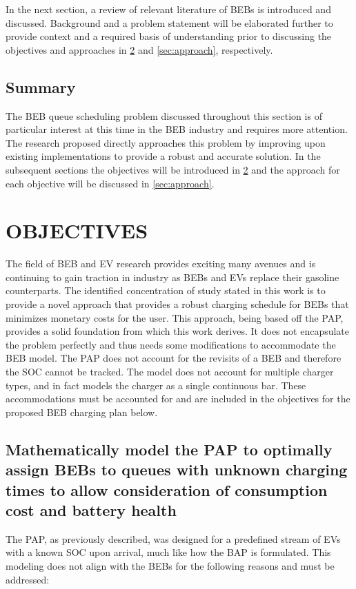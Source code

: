 \documentclass[ee,msthesis]{usuthesis}
\begin{document}
In the next section, a review of relevant literature of BEBs is introduced and discussed. Background and a problem
statement will be elaborated further to provide context and a required basis of understanding prior to discussing the
objectives and approaches in \ref{sec:objectives} and \ref{sec:approach}, respectively.

\section{Summary}
\label{sec:intro-summary}
The BEB queue scheduling problem discussed throughout this section is of particular interest at this time in the BEB
industry and requires more attention. The research proposed directly approaches this problem by improving upon existing
implementations to provide a robust and accurate solution. In the subsequent sections the objectives will be introduced
in \ref{sec:objectives} and the approach for each objective will be discussed in \ref{sec:approach}.
\chapter{OBJECTIVES}
\label{sec:objectives}
The field of BEB and EV research provides exciting many avenues and is continuing to gain traction in industry as BEBs
and EVs replace their gasoline counterparts. The identified concentration of study stated in this work is to provide a
novel approach that provides a robust charging schedule for BEBs that minimizes monetary costs for the user. This
approach, being based off the PAP, provides a solid foundation from which this work derives. It does not encapsulate the
problem perfectly and thus needs some modifications to accommodate the BEB model. The PAP does not account for the
revisits of a BEB and therefore the SOC cannot be tracked. The model does not account for multiple charger types, and in
fact models the charger as a single continuous bar. These accommodations must be accounted for and are included in the
objectives for the proposed BEB charging plan below.

\section{Mathematically model the PAP to optimally assign BEBs to queues with unknown charging times to allow consideration of consumption cost and battery health}
\label{sec:org536fc5f}
The PAP, as previously described, was designed for a predefined stream of EVs with a known SOC upon arrival, much like
how the BAP is formulated. This modeling does not align with the BEBs for the following reasons and must be addressed:
\end{document}
